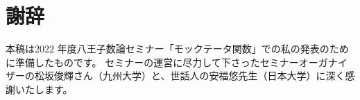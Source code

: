 \documentclass[11pt,b5paper,oneside,lualatex]{ltjsarticle} %
\numberwithin{equation}{section} %
\begin{document}







\section{} \label{sec:}





\subsection{} \label{subsec:}





\section*{謝辞}


本稿は2022 年度八王子数論セミナー「モックテータ関数」での私の発表のために準備したものです。
セミナーの運営に尽力して下さったセミナーオーガナイザーの松坂俊輝さん（九州大学）と、世話人の安福悠先生（日本大学）に深く感謝いたします。







\end{document}
